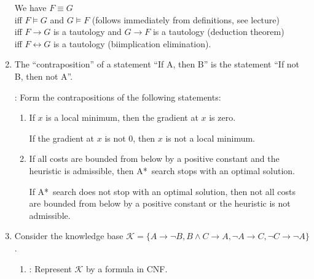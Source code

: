 \documentclass{acAssignment}
\begin{document}
\begin{enumerate}
        \begin{acSolution}
            We have $F \equiv G$\\
            iff $F \models G$ and $G \models F$ (follows immediately from definitions, see lecture)\\
            iff $F \to G$ is a tautology and $G \to F$ is a tautology (deduction theorem)\\
            iff $F \leftrightarrow G$ is a tautology (biimplication elimination).
        \end{acSolution}
        
    \item The \enquote{contraposition} of a statement \enquote{If A, then B} is the statement \enquote{If not B, then not A}.
    
        : Form the contrapositions of the following statements:
        
        \begin{enumerate}
            \item If $x$ is a local minimum, then the gradient at $x$ is zero.
            
                \begin{acSolution}
                    If the gradient at $x$ is not $0$, then $x$ is not a local minimum.
                \end{acSolution}
            
            \item If all costs are bounded from below by a positive constant and the heuristic is admissible, then A*~search stops with an optimal solution.
            
                \begin{acSolution}
                    If A*~search does not stop with an optimal solution, then not all costs are bounded from below by a positive constant or the heuristic is not admissible.
                \end{acSolution}
        \end{enumerate}
        
    \acIfSolution{\clearpage}{}
    \item Consider the knowledge base $\mathcal{K} = \{A \to \lnot B, B \land C \to A, \lnot A \to C, \lnot C \to \lnot A\}$.
    
        \begin{enumerate}
            \item {}: Represent $\mathcal{K}$ by a formula in CNF.
            

\end{enumerate}
\end{enumerate}
\end{document}
